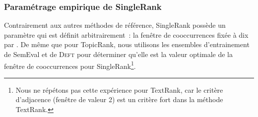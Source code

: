      \subsubsection{Paramétrage empirique de SingleRank}
      \label{subsubsec:main-automatic_keyphrase_annotation-unsupervised_automatic_keyphrase_extraction-evaluation-empirical_setting_of_singlerank}
        Contrairement aux autres méthodes de référence, SingleRank possède un
        paramètre qui est définit arbitrairement~: la fenêtre de cooccurrences
        fixée à dix par . De même que pour TopicRank,
        nous utilisons les ensembles d'entrainement de SemEval et de
        \textsc{Deft} pour déterminer qu'elle est la valeur optimale de la
        fenêtre de cooccurrences pour SingleRank\footnote{Nous ne répétons pas
        cette expérience pour TextRank, car le critère d'adjacence (fenêtre de
        valeur 2) est un critère fort dans la méthode TextRank.}. 

